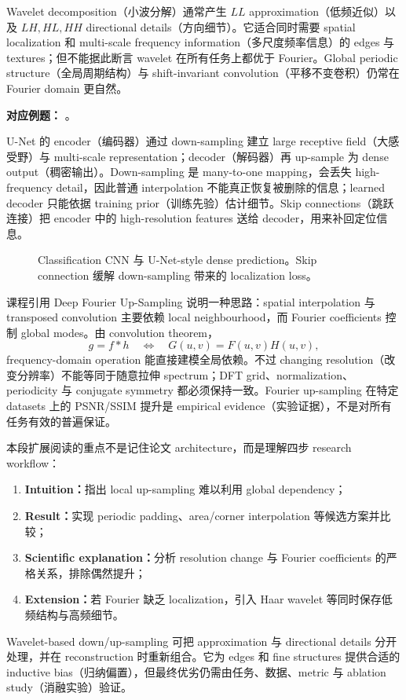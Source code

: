 Wavelet decomposition（小波分解）通常产生 $LL$ approximation（低频近似）以及 $LH,HL,HH$ directional details（方向细节）。它适合同时需要 spatial localization 和 multi-scale frequency information（多尺度频率信息）的 edges 与 textures；但不能据此断言 wavelet 在所有任务上都优于 Fourier。Global periodic structure（全局周期结构）与 shift-invariant convolution（平移不变卷积）仍常在 Fourier domain 更自然。

\textbf{对应例题：}
。


U-Net 的 encoder（编码器）通过 down-sampling 建立 large receptive field（大感受野）与 multi-scale representation；decoder（解码器）再 up-sample 为 dense output（稠密输出）。Down-sampling 是 many-to-one mapping，会丢失 high-frequency detail，因此普通 interpolation 不能真正恢复被删除的信息；learned decoder 只能依据 training prior（训练先验）估计细节。Skip connections（跳跃连接）把 encoder 中的 high-resolution features 送给 decoder，用来补回定位信息。

\begin{figure}[htbp]
  \centering
  \resizebox{0.92\textwidth}{!}{}
  \caption{Classification CNN 与 U-Net-style dense prediction。Skip connection 缓解 down-sampling 带来的 localization loss。}
  \label{fig:sc4061-l05-unet}
\end{figure}

课程引用 Deep Fourier Up-Sampling 说明一种思路：spatial interpolation 与 transposed convolution 主要依赖 local neighbourhood，而 Fourier coefficients 控制 global modes。由 convolution theorem，
\[
  g=f*h
  \quad\Longleftrightarrow\quad
  G(u,v)=F(u,v)H(u,v),
\]
frequency-domain operation 能直接建模全局依赖。不过 changing resolution（改变分辨率）不能等同于随意拉伸 spectrum；DFT grid、normalization、periodicity 与 conjugate symmetry 都必须保持一致。Fourier up-sampling 在特定 datasets 上的 PSNR/SSIM 提升是 empirical evidence（实验证据），不是对所有任务有效的普遍保证。


本段扩展阅读的重点不是记住论文 architecture，而是理解四步 research workflow：
\begin{enumerate}
  \item \textbf{Intuition：}指出 local up-sampling 难以利用 global dependency；
  \item \textbf{Result：}实现 periodic padding、area/corner interpolation 等候选方案并比较；
  \item \textbf{Scientific explanation：}分析 resolution change 与 Fourier coefficients 的严格关系，排除偶然提升；
  \item \textbf{Extension：}若 Fourier 缺乏 localization，引入 Haar wavelet 等同时保存低频结构与高频细节。
\end{enumerate}
Wavelet-based down/up-sampling 可把 approximation 与 directional details 分开处理，并在 reconstruction 时重新组合。它为 edges 和 fine structures 提供合适的 inductive bias（归纳偏置），但最终优劣仍需由任务、数据、metric 与 ablation study（消融实验）验证。

